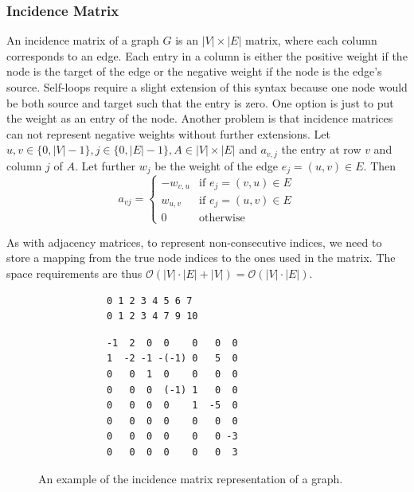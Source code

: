         \subsubsection*{Incidence Matrix}
            An incidence matrix of a graph $G$ is an $|V| \times |E|$ matrix, where each column corresponds to an edge. 
            Each entry in a column is either the positive weight if the node is the target of the edge or the negative weight if the node is the edge's source. Self-loops require a slight extension of this syntax because one node would be both source and target such that the entry is zero. One option is just to put the weight as an entry of the node.  Another problem is that incidence matrices can not represent negative weights without further extensions.        
            Let $u,v \in \{0, |V|-1\}, j \in \{0, |E|-1\}, A \in |V| \times |E|$ and $a_{v,j}$ the entry at row $v$ and column $j$ of $A$. Let further $w_j$ be the weight of the edge $e_j = (u,v) \in E$. Then 
            \[         a_{vj} = \begin{cases}
                        -w_{v,u} & \text{if } e_j = (v,u) \in E \\
                        w_{u,v} & \text{if } e_j = (u,v) \in E \\
                        0 & \text{otherwise}
                        \end{cases}
            \]
            
            As with adjacency matrices, to represent non-consecutive indices, we need to store a mapping from the true node indices to the ones used in the matrix.
            The space requirements are thus $\mathcal{O}(|V| \cdot |E| + |V|) = \mathcal{O}(|V| \cdot |E|)$.
            
            \begin{figure}[htp]
         \begin{center}
         \begin{verbatim}
            0 1 2 3 4 5 6 7
            0 1 2 3 4 7 9 10
          \end{verbatim}
          \begin{verbatim}
            -1  2  0  0    0   0  0
            1  -2 -1 -(-1) 0   5  0
            0   0  1  0    0   0  0
            0   0  0  (-1) 1   0  0
            0   0  0  0    1  -5  0
            0   0  0  0    0   0  0
            0   0  0  0    0   0 -3
            0   0  0  0    0   0  3
          \end{verbatim}
         \end{center}
         \caption{An example of the incidence matrix representation of a graph.}
         \label{incm}
        \end{figure}
            
